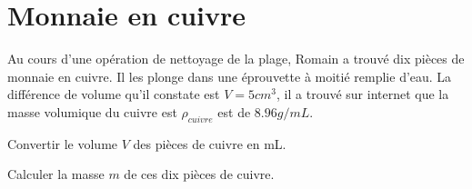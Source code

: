 
\section{Monnaie en cuivre }

Au cours d'une opération de nettoyage de la plage, Romain a trouvé dix pièces de monnaie en cuivre. Il les plonge dans une éprouvette à moitié remplie d'eau. La différence de volume qu'il constate est $V = 5 cm^3$, il a trouvé sur internet que la masse volumique du cuivre est $\rho _{cuivre}$ est de $\num{8.96} g/mL$.  

\begin{questions}
	\question[] Convertir le volume $V$ des pièces de cuivre en mL.
	
	\question[] Calculer la masse $m$ de ces dix pièces de cuivre.
	
\end{questions}
